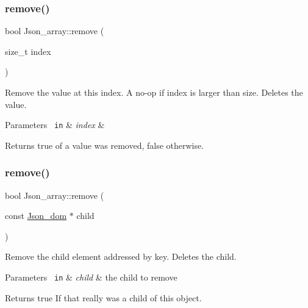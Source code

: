 \subsubsection{\texorpdfstring{remove()}{remove()}\hspace{0.1cm}{\footnotesize\ttfamily [1/2]}}
{\footnotesize\ttfamily bool Json\+\_\+array\+::remove (\begin{DoxyParamCaption}\item[{size\+\_\+t}]{index }\end{DoxyParamCaption})}

Remove the value at this index. A no-\/op if index is larger than size. Deletes the value. 
\begin{DoxyParams}[1]{Parameters}
\mbox{\texttt{ in}}  & {\em index} & \\
\hline
\end{DoxyParams}
\begin{DoxyReturn}{Returns}
true of a value was removed, false otherwise. 
\end{DoxyReturn}
\mbox{\label{classJson__array_a0912b69f4733852316976f2dba87ad9a}} 
\subsubsection{\texorpdfstring{remove()}{remove()}\hspace{0.1cm}{\footnotesize\ttfamily [2/2]}}
{\footnotesize\ttfamily bool Json\+\_\+array\+::remove (\begin{DoxyParamCaption}\item[{const \mbox{\hyperlink{classJson__dom}{Json\+\_\+dom}} $\ast$}]{child }\end{DoxyParamCaption})}

Remove the child element addressed by key. Deletes the child.


\begin{DoxyParams}[1]{Parameters}
\mbox{\texttt{ in}}  & {\em child} & the child to remove\\
\hline
\end{DoxyParams}
\begin{DoxyReturn}{Returns}
true If that really was a child of this object. 
\end{DoxyReturn}
\mbox{\label{classJson__array_af6caa961d3774eebfaaef82daeab63c9}} 
